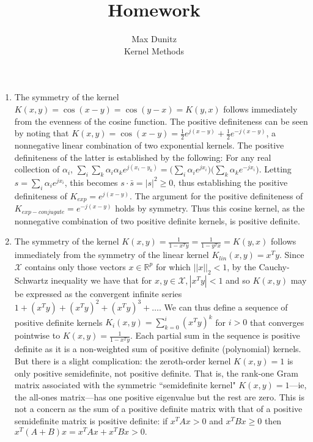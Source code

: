 \documentclass[12pt]{article}
\newenvironment{exercise}[2][Exercise]{\begin{trivlist}
\item[\hskip \labelsep {\bfseries #1}\hskip \labelsep {\bfseries #2.}]}{\end{trivlist}}
\begin{document}
 
 
\title{Homework}%
\author{Max Dunitz\\ %
Kernel Methods} %
 
\maketitle


\begin{exercise}{1} 
	\begin{enumerate}
		\item The symmetry of the kernel $K(x,y) = \cos (x-y) = \cos (y-x) = K(y,x)$ follows immediately from the evenness of the cosine function. The positive definiteness can be seen by noting that $K(x,y) = \cos(x-y) = \frac{1}{2} e^{j(x-y)} + \frac{1}{2} e^{-j(x-y)}$, a nonnegative linear combination of two exponential kernels. The positive definiteness of the latter is established by the following: For any real collection of $\alpha_i$, $\sum_i \sum_k \alpha_i \alpha_k e^{j(x_i - y_k)} = \big(\sum_i \alpha_i e^{jx_i}\big)\big(\sum_k \alpha_k e^{-j x_i} \big).$ Letting $s=\sum_i \alpha_i e^{jx_i}$, this becomes $s \cdot \bar{s} = |s|^2 \geq 0$, thus establishing the positive definiteness of $K_{exp} = e^{j(x-y)}$. The argument for the positive definiteness of $K_{exp-conjugate} = e^{-j(x-y)}$ holds by symmetry. Thus this cosine kernel, as the nonnegative combination of two positive definite kernels, is positive definite.
		\item The symmetry of the kernel $K(x,y) = \frac{1}{1-x^Ty} = \frac{1}{1-y^Tx} = K(y,x)$ follows immediately from the symmetry of the linear kernel $K_{lin}(x,y) = x^Ty$. Since $\mathcal{X}$ contains only those vectors $x \in \mathbb{R}^p$ for which $||x||_2 < 1$, by the Cauchy-Schwartz inequality we have that for $x,y \in \mathcal{X}, |x^T y| < 1$ and so $K(x,y)$ may be expressed as the convergent infinite series $1 + (x^T y) + (x^T y)^2 + (x^T y)^3 + \ldots.$ We can thus define a sequence of positive definite kernels $K_i(x,y) = \sum_{k=0}^i (x^Ty)^k$ for $i >0$ that converges pointwise to $K(x,y) = \frac{1}{1-x^Ty}$. Each partial sum in the sequence is positive definite as it is a non-weighted sum of positive definite (polynomial) kernels. But there is a slight complication: the zeroth-order kernel $K(x,y) = 1$ is only positive semidefinite, not positive definite. That is, the rank-one Gram matrix associated with the symmetric ``semidefinite kernel" $K(x,y) = 1$---ie, the all-ones matrix---has one positive eigenvalue but the rest are zero. This is not a concern as the sum of a positive definite matrix with that of a positive semidefinite matrix is positive definite: if $x^TAx > 0$ and $x^TBx \geq 0$ then $x^T(A+B)x = x^TAx + x^T B x > 0.$

\end{enumerate}
\end{exercise}
\end{document}
